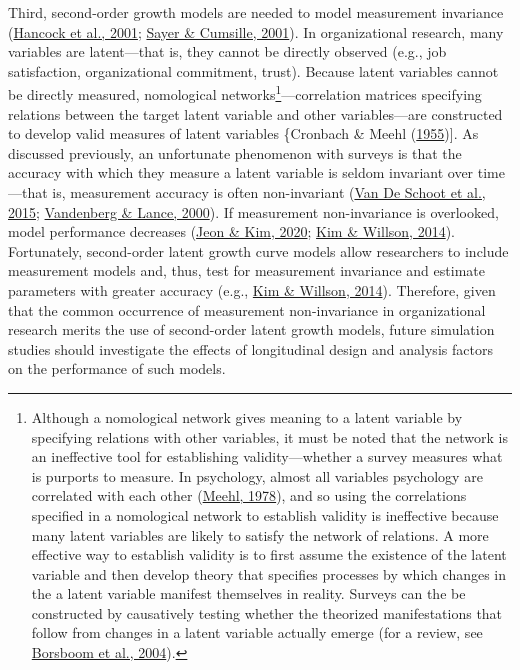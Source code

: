 \documentclass[
12pt, %
twoside,
english]{guelphthesis}
\begin{document}
Third, second-order growth models are needed to model measurement invariance (\protect\hyperlink{ref-hancock2001}{Hancock et al., 2001}; \protect\hyperlink{ref-sayer2001}{Sayer \& Cumsille, 2001}). In organizational research, many variables are latent---that is, they cannot be directly observed (e.g., job satisfaction, organizational commitment, trust). Because latent variables cannot be directly measured, nomological networks\footnote{Although a nomological network gives meaning to a latent variable by specifying relations with other variables, it must be noted that the network is an ineffective tool for establishing validity---whether a survey measures what is purports to measure. In psychology, almost all variables psychology are correlated with each other (\protect\hyperlink{ref-meehl1978}{Meehl, 1978}), and so using the correlations specified in a nomological network to establish validity is ineffective because many latent variables are likely to satisfy the network of relations. A more effective way to establish validity is to first assume the existence of the latent variable and then develop theory that specifies processes by which changes in the a latent variable manifest themselves in reality. Surveys can the be constructed by causatively testing whether the theorized manifestations that follow from changes in a latent variable actually emerge (for a review, see \protect\hyperlink{ref-borsboom2004}{Borsboom et al., 2004}).}---correlation matrices specifying relations between the target latent variable and other variables---are constructed to develop valid measures of latent variables \{Cronbach \& Meehl (\protect\hyperlink{ref-cronbach1955}{1955}){]}. As discussed previously, an unfortunate phenomenon with surveys is that the accuracy with which they measure a latent variable is seldom invariant over time---that is, measurement accuracy is often non-invariant (\protect\hyperlink{ref-vandeschoot2015}{Van De Schoot et al., 2015}; \protect\hyperlink{ref-vandenberg2000}{Vandenberg \& Lance, 2000}). If measurement non-invariance is overlooked, model performance decreases (\protect\hyperlink{ref-jeon2020}{Jeon \& Kim, 2020}; \protect\hyperlink{ref-kim2014b}{Kim \& Willson, 2014}). Fortunately, second-order latent growth curve models allow researchers to include measurement models and, thus, test for measurement invariance and estimate parameters with greater accuracy (e.g., \protect\hyperlink{ref-kim2014a}{Kim \& Willson, 2014}). Therefore, given that the common occurrence of measurement non-invariance in organizational research merits the use of second-order latent growth models, future simulation studies should investigate the effects of longitudinal design and analysis factors on the performance of such models.
\end{document}
